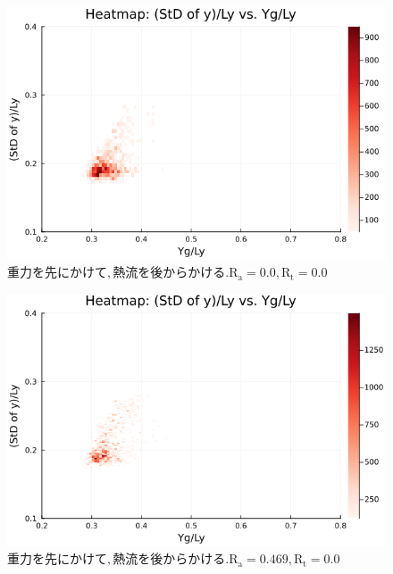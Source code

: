 
\begin{figure}[H]
  \centering
  \includegraphics[scale=0.6]{image/RaRtmap_drop_heat/2023-12-21T10:44:56.628_RaRtmap_chi1.265_Ay50_rho0.4_T0.43_dT0.04_Rd0.0_Rt0.0_Ra0.0_g0.0003999718779659611_run4.0e7.png}
  \caption{$重力を先にかけて, 熱流を後からかける. \text{R}_\text{a}=0.0,\text{R}_\text{t}=0.0$}
\end{figure}

\begin{figure}[H]
  \centering
  \includegraphics[scale=0.6]{image/RaRtmap_drop_heat/2023-12-21T10:44:57.232_RaRtmap_chi1.265_Ay50_rho0.4_T0.43_dT0.04_Rd0.0_Rt0.0_Ra0.4693845_g0.0003999718779659611_run4.0e7.png}
  \caption{$重力を先にかけて, 熱流を後からかける. \text{R}_\text{a}=0.469,\text{R}_\text{t}=0.0$}
  \label{}
\end{figure}

